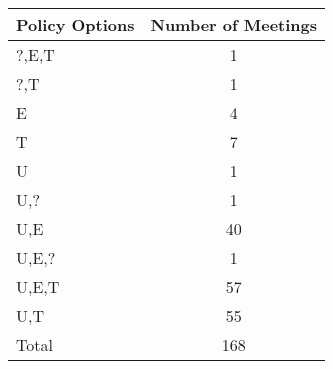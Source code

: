 \begin{tabular}{lc}
\hline\hline 
\addlinespace 
Policy Options & Number of Meetings \\ 
\hline 
?,E,T & 1 \\
?,T & 1 \\
E & 4 \\
T & 7 \\
U & 1 \\
U,? & 1 \\
U,E & 40 \\
U,E,? & 1 \\
U,E,T & 57 \\
U,T & 55 \\
\addlinespace 
Total & 168 \\
\hline 
\end{tabular}